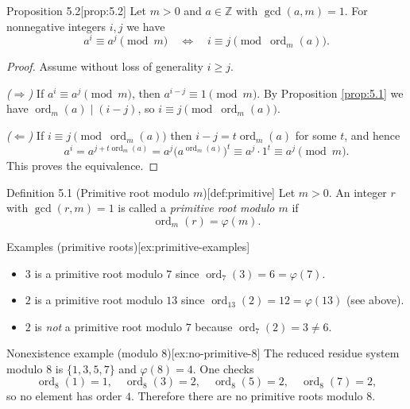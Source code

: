 \documentclass[10pt]{article}
\theoremstyle{definition}
\theoremstyle{plain}
\numberwithin{equation}{section}
\begin{document}
\bigskip

\begin{define}{Proposition 5.2}[prop:5.2]
Let $m>0$ and $a\in\mathbb{Z}$ with $\gcd(a,m)=1$. For nonnegative integers $i,j$ we have
\[
a^i\equiv a^j\pmod m \quad\Longleftrightarrow\quad i\equiv j\pmod{\operatorname{ord}_m(a)}.
\]
\end{define}

\begin{proof}
Assume without loss of generality $i\ge j$.

\emph{($\Rightarrow$)} If $a^i\equiv a^j\pmod m$, then $a^{i-j}\equiv 1\pmod m$. By Proposition \ref{prop:5.1} we have $\operatorname{ord}_m(a)\mid (i-j)$, so $i\equiv j\pmod{\operatorname{ord}_m(a)}$.

\emph{($\Leftarrow$)} If $i\equiv j\pmod{\operatorname{ord}_m(a)}$ then $i-j=t\operatorname{ord}_m(a)$ for some $t$, and hence
\[
a^{i}=a^{j+t\operatorname{ord}_m(a)}=a^j\bigl(a^{\operatorname{ord}_m(a)}\bigr)^t\equiv a^j\cdot 1^t\equiv a^j\pmod m.
\]
This proves the equivalence.
\end{proof}

\bigskip

\begin{define}{Definition 5.1 (Primitive root modulo $m$)}[def:primitive]
Let $m>0$. An integer $r$ with $\gcd(r,m)=1$ is called a \emph{primitive root modulo $m$} if
\[
\operatorname{ord}_m(r)=\varphi(m).
\]
\end{define}

\begin{define}{Examples (primitive roots)}[ex:primitive-examples]
\begin{itemize}
  \item $3$ is a primitive root modulo $7$ since $\operatorname{ord}_7(3)=6=\varphi(7)$.
  \item $2$ is a primitive root modulo $13$ since $\operatorname{ord}_{13}(2)=12=\varphi(13)$ (see above).
  \item $2$ is \emph{not} a primitive root modulo $7$ because $\operatorname{ord}_7(2)=3\neq 6$.
\end{itemize}
\end{define}

\begin{define}{Nonexistence example (modulo $8$)}[ex:no-primitive-8]
The reduced residue system modulo $8$ is $\{1,3,5,7\}$ and $\varphi(8)=4$. One checks
\[
\operatorname{ord}_8(1)=1,\quad \operatorname{ord}_8(3)=2,\quad \operatorname{ord}_8(5)=2,\quad \operatorname{ord}_8(7)=2,
\]
so no element has order $4$. Therefore there are no primitive roots modulo $8$.
\end{define}
\end{document}
